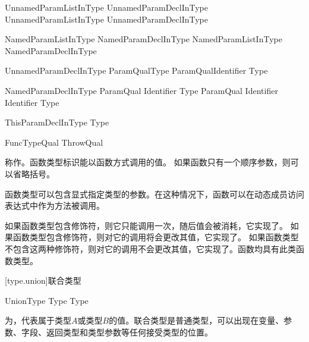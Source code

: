 \begin{bnf}{UnnamedParamListInType}
    UnnamedParamDeclInType \br
    UnnamedParamListInType \terminal{,} UnnamedParamDeclInType
\end{bnf}

\begin{bnf}{NamedParamListInType}
    NamedParamDeclInType \br
    NamedParamListInType \terminal{,} NamedParamDeclInType
\end{bnf}

\begin{bnf}{UnnamedParamDeclInType}
    ParamQual\bnfq Type \br
    ParamQual\bnfq Identifier \terminal{:} Type\bnfq
\end{bnf}

\begin{bnf}{NamedParamDeclInType}
    ParamQual\bnfq \terminal{(} Identifier \terminal{)} Type\bnfq \br
    ParamQual\bnfq \terminal{(} Identifier \terminal{)} Identifier \terminal{:} Type\bnfq
\end{bnf}

\begin{bnf}{ThisParamDeclInType}
     \terminal{:} Type
\end{bnf}

\begin{bnf}{FuncTypeQual}
    ThrowQual \br
     \br
     \br
     \br
\end{bnf}

\pnum
{}称作。函数类型标识能以函数方式调用的值。
如果函数只有一个顺序参数，则可以省略括号。

\pnum
函数类型可以包含显式指定类型的参数。在这种情况下，函数可以在动态成员访问表达式中作为方法被调用。

\pnum
如果函数类型包含修饰符，则它只能调用一次，随后值会被消耗，它实现了。
如果函数类型包含修饰符，则对它的调用将会更改其值，它实现了。
如果函数类型不包含这两种修饰符，则对它的调用不会更改其值，它实现了。函数均具有此类函数类型。

[type.union]{联合类型}

\begin{bnf}{UnionType}
    Type \terminal{|} Type
\end{bnf}

\pnum
{}为，代表属于类型$A$或类型$B$的值。联合类型是普通类型，可以出现在变量、参数、字段、返回类型和类型参数等任何接受类型的位置。

